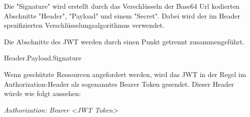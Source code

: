 Die "Signature" wird erstellt durch das Verschlüsseln der Base64 Url kodierten Abschnitte "Header", "Payload" und einem "Secret". 
Dabei wird der im Header spezifizierten Verschlüsselungsalgorithmus verwendet.

Die Abschnitte des JWT werden durch einen Punkt getrennt zusammengeführt. 

{\ttfamily Header.Payload.Signature}

Wenn geschützte Ressourcen angefordert werden, wird das JWT in der Regel im Authorization-Header als sogenanntes Bearer Token gesendet. Dieser Header würde wie folgt aussehen:

\emph{Authorization: Bearer \textless JWT Token\textgreater}

\cite{Auth0JWT}
\cite{RFC7519}
\cite{WdsJWT}